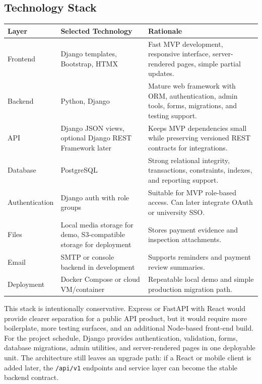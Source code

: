 \documentclass[11pt,a4paper]{article}
\begin{document}
\subsection{Technology Stack}

\begin{longtable}{L{0.22\textwidth} L{0.25\textwidth} L{0.40\textwidth}}
\toprule
\textbf{Layer} & \textbf{Selected Technology} & \textbf{Rationale}\\
\midrule
\endhead
Frontend & Django templates, Bootstrap, HTMX & Fast MVP development, responsive interface, server-rendered pages, simple partial updates.\\
Backend & Python, Django & Mature web framework with ORM, authentication, admin tools, forms, migrations, and testing support.\\
API & Django JSON views, optional Django REST Framework later & Keeps MVP dependencies small while preserving versioned REST contracts for integrations.\\
Database & PostgreSQL & Strong relational integrity, transactions, constraints, indexes, and reporting support.\\
Authentication & Django auth with role groups & Suitable for MVP role-based access. Can later integrate OAuth or university SSO.\\
Files & Local media storage for demo, S3-compatible storage for deployment & Stores payment evidence and inspection attachments.\\
Email & SMTP or console backend in development & Supports reminders and payment review summaries.\\
Deployment & Docker Compose or cloud VM/container & Repeatable local demo and simple production migration path.\\
\bottomrule
\end{longtable}

This stack is intentionally conservative. Express or FastAPI with React would provide clearer separation for a public API product, but it would require more boilerplate, more testing surfaces, and an additional Node-based front-end build. For the project schedule, Django provides authentication, validation, forms, database migrations, admin utilities, and server-rendered pages in one deployable unit. The architecture still leaves an upgrade path: if a React or mobile client is added later, the \texttt{/api/v1} endpoints and service layer can become the stable backend contract.
\end{document}
